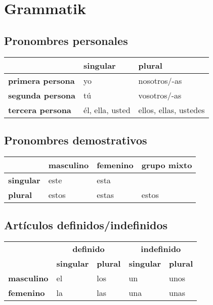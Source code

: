 \documentclass{article}
\begin{document}
	\section{Grammatik}
	
	\subsection{Pronombres personales}
	
	\begin{center}
		\begin{tabular}{l|l|l}
			& \textbf{singular} & \textbf{plural} \\
			\hline
			\textbf{primera persona} & yo & nosotros/-as \\
			\hline
			\textbf{segunda persona} & tú & vosotros/-as \\
			\hline
			\textbf{tercera persona} & él, ella, usted & ellos, ellas, ustedes
		\end{tabular}
	\end{center}
	
	\subsection{Pronombres demostrativos}
	
	\begin{center}
		\begin{tabular}{l|lll}
			& \textbf{masculino} & \textbf{femenino} & \textbf{grupo mixto} \\
			\hline
			\textbf{singular} & este & esta & \\
			\hline
			\textbf{plural} & estos & estas & estos
		\end{tabular}
	\end{center}
	
	\subsection{Artículos definidos/indefinidos}
	
	\begin{center}
		\begin{tabular}{l|ll|ll}
			& \multicolumn{2}{c|}{\textbf{definido}} & \multicolumn{2}{c}{\textbf{indefinido}} \\
			& \textbf{singular} & \textbf{plural} &  \textbf{singular} & \textbf{plural} \\
			\hline
			\textbf{masculino} & el & los & un & unos \\
			\hline
			\textbf{femenino} & la & las & una & unas
		\end{tabular}
	\end{center}
\end{document}
